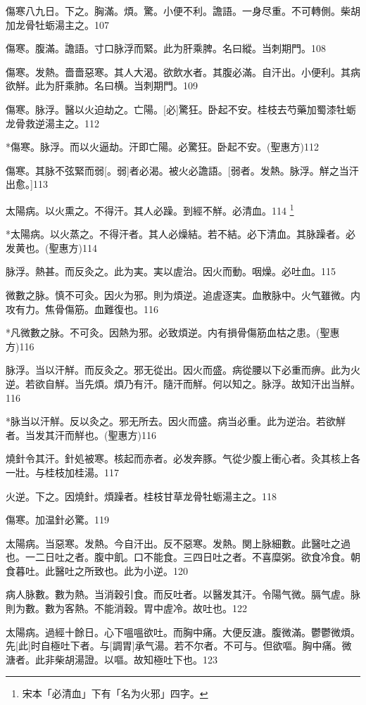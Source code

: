 \documentclass[12pt,twoside,UTF8,b5paper]{ctexbook}
\begin{document}
傷寒八九日。下之。胸滿。煩。驚。小便不利。譫語。一身尽重。不可轉側。柴胡加龙骨牡蛎湯主之。107

傷寒。腹滿。譫語。寸口脉浮而緊。此为肝乘脾。名曰縱。当刺期門。108

傷寒。发熱。嗇嗇惡寒。其人大渴。欲飲水者。其腹必滿。自汗出。小便利。其病欲觧。此为肝乘肺。名曰横。当刺期門。109

傷寒。脉浮。醫以火迫劫之。亡陽。[必]驚狂。卧起不安。桂枝去芍藥加蜀漆牡蛎龙骨救逆湯主之。112

*傷寒。脉浮。而以火逼劫。汗即亡陽。必驚狂。卧起不安。(聖惠方)112

傷寒。其脉不弦緊而弱[。弱]者必渴。被火必譫語。[弱者。发熱。脉浮。觧之当汗出愈。]113

太陽病。以火熏之。不得汗。其人必躁。到經不觧。必清血。114
	\footnote{宋本「必清血」下有「名为火邪」四字。}

*太陽病。以火蒸之。不得汗者。其人必燥結。若不結。必下清血。其脉躁者。必发黄也。(聖惠方)114

脉浮。熱甚。而反灸之。此为実。実以虗治。因火而動。咽燥。必吐血。115　

微數之脉。慎不可灸。因火为邪。則为煩逆。追虗逐実。血散脉中。火气雖微。内攻有力。焦骨傷筋。血難復也。116

*凡微數之脉。不可灸。因熱为邪。必致煩逆。内有損骨傷筋血枯之患。(聖惠方)116

脉浮。当以汗觧。而反灸之。邪无從出。因火而盛。病從腰以下必重而痹。此为火逆。若欲自觧。当先煩。煩乃有汗。隨汗而觧。何以知之。脉浮。故知汗出当觧。116

*脉当以汗觧。反以灸之。邪无所去。因火而盛。病当必重。此为逆治。若欲觧者。当发其汗而觧也。(聖惠方)116

燒針令其汗。針処被寒。核起而赤者。必发奔豚。气從少腹上衝心者。灸其核上各一壯。与桂枝加桂湯。117

火逆。下之。因燒針。煩躁者。桂枝甘草龙骨牡蛎湯主之。118

傷寒。加温針必驚。119

太陽病。当惡寒。发熱。今自汗出。反不惡寒。发熱。関上脉細數。此醫吐之過也。一二日吐之者。腹中飢。口不能食。三四日吐之者。不喜糜粥。欲食冷食。朝食暮吐。此醫吐之所致也。此为小逆。120

病人脉數。數为熱。当消穀引食。而反吐者。以醫发其汗。令陽气微。膈气虗。脉則为數。數为客熱。不能消穀。胃中虗冷。故吐也。122

太陽病。過經十餘日。心下嗢嗢欲吐。而胸中痛。大便反溏。腹微滿。鬱鬱微煩。先[此]时自極吐下者。与[調胃]承气湯。若不尔者。不可与。但欲嘔。胸中痛。微溏者。此非柴胡湯證。以嘔。故知極吐下也。123
\end{document}
